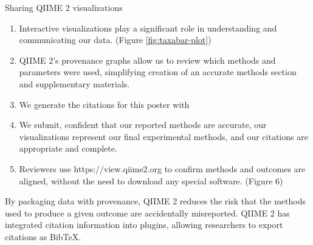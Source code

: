 \documentclass[final]{beamer}
\newlength{\colwidth}
\begin{document}
\begin{frame}[t]
\begin{columns}[t]
\begin{column}{\colwidth}
\begin{block}{Sharing QIIME 2 visualizations}
    \begin{enumerate}
      \item Interactive visualizations play a significant role in understanding and
      communicating our data. (Figure \ref{fig:taxabar-plot})
      \item QIIME 2’s provenance graphs allow us to review which methods and
      parameters were used, simplifying creation of an accurate methods section
      and supplementary materials.
      \item We generate the citations for this poster with 
      \item We submit, confident that our reported methods are accurate, our
      visualizations represent our final experimental methods, and our
      citations are appropriate and complete.
      \item Reviewers use https://view.qiime2.org to confirm methods and outcomes are
      aligned, without the need to download any special software. (Figure 6)
    \end{enumerate}

    \begin{tcolorbox}
    [width=\textwidth, colframe=blue]
    {By packaging data with provenance, QIIME 2 reduces the risk that the
    methods used to produce a given outcome are accidentally misreported.
    QIIME 2 has integrated citation information into plugins, allowing
    researchers to export citations as BibTeX}.
    \end{tcolorbox}



\end{block}
\end{column}
\end{columns}
\end{frame}
\end{document}
